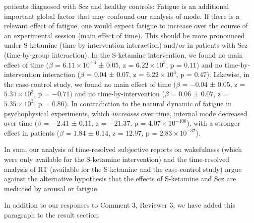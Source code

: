 \documentclass[
]{article}
\begin{document}
\begin{enumerate}
  patients diagnosed with Scz and healthy controls: Fatigue is an
  additional important global factor that may confound our analysis of
  mode. If there is a relevant effect of fatigue, one would expect
  fatigue to increase over the course of an experimental session (main
  effect of time). This should be more pronounced under S-ketamine
  (time-by-intervention interaction) and/or in patients with Scz
  (time-by-group interaction). In the S-ketamine intervention, we found
  no main effect of time (\(\beta\) =
  \(\ensuremath{6.11\times 10^{-3}}\) ± \(0.05\), z =
  \(\ensuremath{6.22\times 10^{3}}\), p = \(0.11\)) and no
  time-by-intervention interaction (\(\beta\) = \(0.04\) ± \(0.07\), z =
  \(\ensuremath{6.22\times 10^{3}}\), p = \(0.47\)). Likewise, in the
  case-control study, we found no main effect of time (\(\beta\) =
  \(-0.04\) ± \(0.05\), z = \(\ensuremath{5.34\times 10^{3}}\), p =
  \(-0.71\)) and no time-by-intervention (\(\beta\) = \(0.06\) ±
  \(0.07\), z = \(\ensuremath{5.35\times 10^{3}}\), p = \(0.86\)). In
  contradiction to the natural dynamic of fatigue in psychophysical
  experiments, which \emph{increases} over time, internal mode decreased
  over time (\(\beta\) = \(-2.41\) ± \(0.11\), z = \(-21.37\), p =
  \(\ensuremath{4.07\times 10^{-100}}\)), with a stronger effect in
  patients (\(\beta\) = \(1.84\) ± \(0.14\), z = \(12.97\), p =
  \(\ensuremath{2.83\times 10^{-37}}\)).
\end{enumerate}

In sum, our analysis of time-resolved subjective reports on wakefulness
(which were only available for the S-ketamine intervention) and the
time-resolved analysis of RT (available for the S-ketamine and the
case-control study) argue against the alternative hypothesis that the
effects of S-ketamine and Scz are mediated by arousal or fatigue.

In addition to our responses to Comment 3, Reviewer 3, we have added
this paragraph to the result section:
\end{document}
